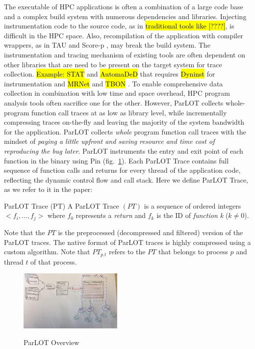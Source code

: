The executable of HPC applications is often a combination of a large code base and a complex build system with numerous dependencies and libraries. Injecting instrumentation code to the source code, as in \hl{traditional tools like [????]}, is difficult in the HPC space. Also, recompilation of the application with compiler wrappers, as in TAU \cite{tau} and Score-p \cite{scorep}, may break the build system.
The instrumentation and tracing mechanism of existing tools are often dependent on other libraries that are need to be present on the target system for trace collection. \hl{Example: STAT} \cite{stat} and \hl{AutomaDeD} \cite{automaded-laguna} that requires \hl{Dyninst} \cite{dyninst} for instrumentation and \hl{MRNet} \cite{mrnet} and \hl{ TBON} \cite{tbon}.
%
To enable comprehensive data collection in combination with low time and space overhead, HPC program analysis tools often sacrifice one for the other. However, ParLOT collects whole-program function call traces at as low as library level, while incrementally compressing traces on-the-fly and leaving the majority of the system bandwidth for the application.
%
ParLOT collects \textit{whole} program function call traces with the mindset of \textit{paying a little upfront and saving resource and time cost of reproducing the bug later}.
%
ParLOT instruments the entry and exit point of each function in the binary using Pin \cite{pin} (fig.~\ref{fig.parlotOverview}). Each ParLOT Trace contains full sequence of function calls and returns for every thread of the application code, reflecting the dynamic control flow and call stack.
%
Here we define ParLOT Trace, as we refer to it in the paper:

\begin{definition}{ParLOT Trace (PT)}
A ParLOT Trace $(PT)$ is a sequence of ordered integers $<f_i,...,f_j>$ where $f_0$ represents a \textit{return} and $f_k$ is the ID of \textit{function k} ($k \neq 0$).
\end{definition}
%
Note that the $PT$ is the preprocessed (decompressed and filtered) version of the ParLOT traces. The native format of ParLOT traces is highly compressed using a custom algorithm.
%
Note that $PT_{p.t}$ refers to the $PT$ that belongs to process $p$ and thread $t$ of that process.
%
\begin{figure}[t]
\caption{ParLOT Overview}
\includegraphics[width=0.45\textwidth]{figs/parlotOverview.jpg}
\label{fig.parlotOverview}
\end{figure}

